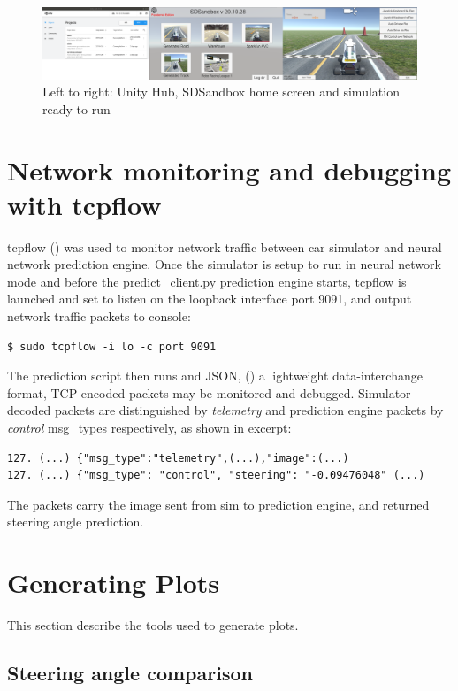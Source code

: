 \begin{figure}[ht]
 \centering 
 \includegraphics[scale=0.17]{Figures/UnityHubSDSandbox3in1.png}
 \caption{Left to right: Unity Hub, SDSandbox home screen and simulation ready to run}
 \label{fig:SDSandboxHome}
\end{figure}



\section{Network monitoring and debugging with tcpflow}
\label{NetMonDebug}
tcpflow (\cite{garfinkel2013passive}) was used to monitor network traffic between car simulator and neural network prediction engine. Once the simulator is setup to run in neural network mode and before the predict\_client.py prediction engine starts, tcpflow is launched and set to listen on the loopback interface port 9091, and output network traffic packets to console:
\begin{verbatim}
$ sudo tcpflow -i lo -c port 9091
\end{verbatim}
The prediction script then runs and JSON, (\cite{pezoa2016foundations}) a lightweight data-interchange format, TCP encoded packets may be monitored and debugged. Simulator decoded packets are distinguished by \textit{telemetry} and prediction engine packets by \textit{control} msg\_types respectively, as shown in excerpt:
\begin{verbatim}
127. (...) {"msg_type":"telemetry",(...),"image":(...)
127. (...) {"msg_type": "control", "steering": "-0.09476048" (...)
\end{verbatim}
The packets carry the image sent from sim to prediction engine, and returned steering angle prediction.

\section{Generating Plots}

This section describe the tools used to generate plots.

\subsection{Steering angle comparison}

